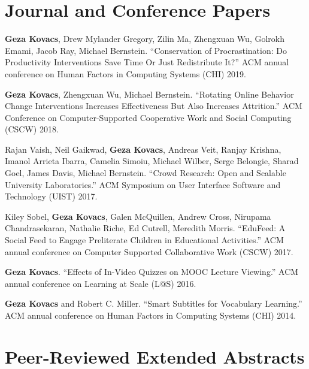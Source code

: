 \documentclass[margin,line]{resume}
\begin{document}
\begin{resume}
\section{\mysidestyle Journal and Conference Papers}


\textbf{Geza Kovacs}, Drew Mylander Gregory, Zilin Ma, Zhengxuan Wu, Golrokh Emami, Jacob Ray, Michael Bernstein. ``Conservation of Procrastination: Do Productivity Interventions Save Time Or Just Redistribute It?'' ACM annual conference on Human Factors in Computing Systems (CHI) 2019. %

\textbf{Geza Kovacs}, Zhengxuan Wu, Michael Bernstein. ``Rotating Online Behavior Change Interventions Increases Effectiveness But Also Increases Attrition.'' ACM Conference on Computer-Supported Cooperative Work and Social Computing (CSCW) 2018. %

Rajan Vaish, Neil Gaikwad, \textbf{Geza Kovacs}, Andreas Veit, Ranjay Krishna, Imanol Arrieta Ibarra, Camelia Simoiu, Michael Wilber, Serge Belongie, Sharad Goel, James Davis, Michael Bernstein. ``Crowd Research: Open and Scalable University Laboratories.'' ACM Symposium on User Interface Software and Technology (UIST) 2017. %

Kiley Sobel, \textbf{Geza Kovacs}, Galen McQuillen, Andrew Cross, Nirupama Chandrasekaran, Nathalie Riche, Ed Cutrell, Meredith Morris. ``EduFeed: A Social Feed to Engage Preliterate Children in Educational Activities.'' ACM annual conference on Computer Supported Collaborative Work (CSCW) 2017. %

\textbf{Geza Kovacs}. ``Effects of In-Video Quizzes on MOOC Lecture Viewing.'' ACM annual conference on Learning at Scale (L@S) 2016. %

\textbf{Geza Kovacs} and Robert C. Miller. ``Smart Subtitles for Vocabulary Learning.'' ACM annual conference on Human Factors in Computing Systems (CHI) 2014. %


\section{\mysidestyle Peer-Reviewed Extended Abstracts}


\end{resume}
\end{document}
